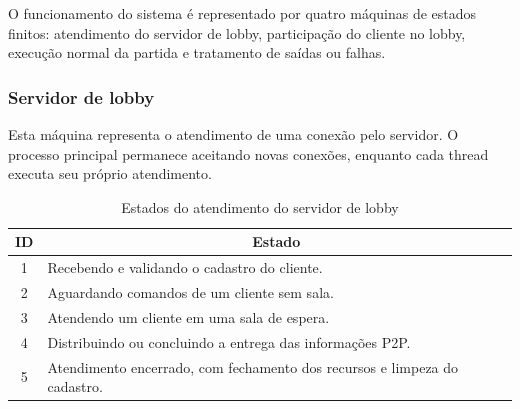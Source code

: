 \documentclass[11pt,a4paper]{article}
\begin{document}
O funcionamento do sistema é representado por quatro máquinas de estados finitos: atendimento do servidor de lobby, participação do cliente no lobby, execução normal da partida e tratamento de saídas ou falhas.



\subsubsection{Servidor de lobby}

Esta máquina representa o atendimento de uma conexão pelo servidor. O processo principal permanece aceitando novas conexões, enquanto cada thread executa seu próprio atendimento.

\begin{table}[H]
    \centering
    \caption{Estados do atendimento do servidor de lobby}
    \label{tab:fsm_servidor_estados}
    \begin{tabular}{|c|p{11.7cm}|}
        \hline
        \textbf{ID} & \multicolumn{1}{c|}{\textbf{Estado}} \\ \hline
        1 & Recebendo e validando o cadastro do cliente. \\ \hline
        2 & Aguardando comandos de um cliente sem sala. \\ \hline
        3 & Atendendo um cliente em uma sala de espera. \\ \hline
        4 & Distribuindo ou concluindo a entrega das informações P2P. \\ \hline
        5 & Atendimento encerrado, com fechamento dos recursos e limpeza do cadastro. \\ \hline
    \end{tabular}
\end{table}
\end{document}
